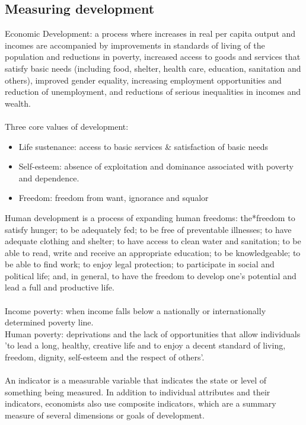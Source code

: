 \documentclass[a4paper,12pt]{article}
\begin{document}
\subsection{Measuring development}
Economic Development: a process where increases in real per capita output and incomes are accompanied by improvements in standards of living of the population and reductions in poverty, increased access to goods and services that satisfy basic needs (including food, shelter, health care, education, sanitation and others), improved gender equality, increasing employment opportunities and reduction of unemployment, and reductions of serious inequalities in incomes and wealth.\\\\
Three core values of development:
\begin{itemize}
  \item Life sustenance: access to basic services \& satisfaction of basic needs
  \item Self-esteem: absence of exploitation and dominance associated with poverty and dependence.
  \item Freedom: freedom from want, ignorance and squalor
\end{itemize}
Human development is a process of expanding human freedoms: the*freedom to satisfy hunger; to be adequately fed; to be free of preventable illnesses; to have adequate clothing and shelter; to have access to clean water and sanitation; to be able to read, write and receive an appropriate education; to be knowledgeable; to be able to find work; to enjoy legal protection; to participate in social and political life; and, in general, to have the freedom to develop one's potential and lead a full and productive life.\\\\
Income poverty: when income falls below a nationally or internationally determined poverty line.\\
Human poverty: deprivations and the lack of opportunities that allow individuals 'to lead a long, healthy, creative life and to enjoy a decent standard of living, freedom, dignity, self-esteem and the respect of others'.\\\\
An indicator is a measurable variable that indicates the state or level of something being measured. In addition to individual attributes and their indicators, economists also use composite indicators, which are a summary measure of several dimensions or goals of development. \\\\
\end{document}
